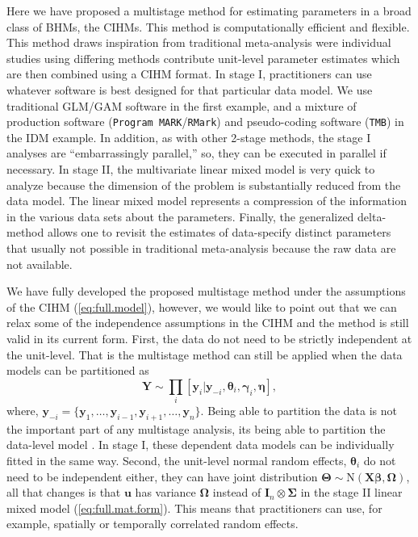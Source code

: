 \documentclass[12pt]{article}
\newcommand{\by}{\mathbf{y}}
\newcommand{\bt}{\boldsymbol{\theta}}
\newcommand{\bb}{\boldsymbol{\beta}}
\newcommand{\bn}{\boldsymbol{\eta}}
\newcommand{\bT}{\boldsymbol{\Theta}}
\newcommand{\bg}{\boldsymbol{\gamma}}
\newcommand{\bSig}{\boldsymbol{\Sigma}}
\newcommand{\bO}{\boldsymbol{\Omega}}
\newcommand{\bX}{\mathbf{X}}
\newcommand{\bu}{\mathbf{u}}
\newcommand{\tN}{\text{N}}
\newcommand{\bY}{\mathbf{Y}}
\newcommand{\bI}{\mathbf{I}}
\begin{document}
Here we have proposed a multistage method for estimating parameters in a broad class of BHMs, the CIHMs. This method is computationally efficient and flexible. This method draws inspiration from traditional meta-analysis were individual studies using differing methods contribute unit-level parameter estimates which are then combined using a CIHM format. In stage I, practitioners can use whatever software is best designed for that particular data model. We use traditional GLM/GAM software in the first example, and a mixture of production software ({\tt Program MARK}/{\tt RMark}) and pseudo-coding software ({\tt TMB}) in the IDM example. In addition, as with other 2-stage methods, the stage I analyses are ``embarrassingly parallel,'' so, they can be executed in parallel if necessary. In stage II, the multivariate linear mixed model is very quick to analyze because the dimension of the problem is substantially reduced from the data model. The linear mixed model represents a compression of the information in the various data sets about the parameters. Finally, the generalized delta-method allows one to revisit the estimates of data-specify distinct parameters that usually not possible in traditional meta-analysis because the raw data are not available.  

We have fully developed the proposed multistage method under the assumptions of the CIHM (\ref{eq:full.model}), however, we would like to point out that we can relax some of the independence assumptions in the CIHM and the method is still valid in its current form. First, the data do not need to be strictly independent at the unit-level. That is the multistage method can still be applied when the data models can be partitioned as
\[
\bY \sim \prod_i[\by_i|\by_{-i}, \bt_i, \bg_i, \bn],
\]
where, $\by_{-i} = \{\by_1,\dots,\by_{i-1},\by_{i+1},\dots,\by_n\}$. Being able to partition the data is not the important part of any multistage analysis, its being able to partition the data-level model \citep{hooten2018prior}. In stage I, these dependent data models can be individually fitted in the same way. Second, the unit-level normal random effects, $\bt_i$ do not need to be independent either, they can have joint distribution $\bT  \sim \tN(\bX\bb, \bO)$, all that changes is that $\bu$ has variance $\bO$ instead of $\bI_n \otimes \bSig$ in the stage II linear mixed model (\ref{eq:full.mat.form}). This means that practitioners can use, for example, spatially or temporally correlated random effects. 
\end{document}
